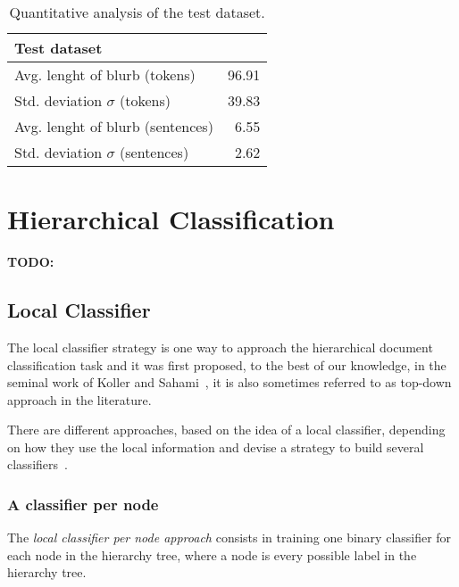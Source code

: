 \documentclass[11pt,a4paper]{article}
\begin{document}
\begin{table}
\begin{center}
\begin{tabular}{|l|r|}
\hline\centering\textbf{Test dataset}  &         \\
\hline
Avg. lenght of blurb (tokens)              &  96.91             \\
Std. deviation $\sigma$ (tokens)           &  39.83             \\
Avg. lenght of blurb (sentences)           &  6.55              \\
Std. deviation $\sigma$ (sentences)        &  2.62              \\
\hline
\end{tabular}
\end{center}
\caption{\label{quantitivy-analysis-test}Quantitative analysis of the test dataset.}
\end{table}




\section{Hierarchical Classification}\label{hierarchical-clf}


\textbf{TODO:}

\subsection{Local Classifier}

The local classifier strategy is one way to approach the hierarchical document classification task
and it was first proposed, to the best of our knowledge, in the seminal work of Koller and
Sahami~, it is also sometimes referred to as top-down
approach in the literature.

There are different approaches, based on the idea of a local classifier, depending on how they use
the local information and devise a strategy to build several classifiers~\cite{Silla:2011:SHC:1937796.1937884}.


\subsubsection{A classifier per node} %
The \textit{local classifier per node approach} consists in training one binary classifier for each
node in the hierarchy tree, where a node is every possible label in the hierarchy tree.
\end{document}
